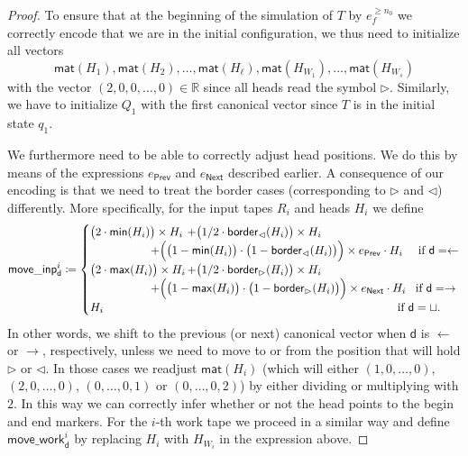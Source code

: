\begin{proof}
    To ensure that at the beginning of the simulation of $T$ by $e_f^{\geq n_0}$ we correctly encode 
    that we are in the initial configuration, we thus need to initialize all vectors 
    $$\mathsf{mat}(H_1),\mathsf{mat}(H_2),\ldots, \mathsf{mat}(H_\ell), \mathsf{mat}(H_{W_1}),\ldots, \mathsf{mat}(H_{W_s})$$
    with the vector $(2,0,0,\ldots,0)\in\mathbb{R}$ since all heads read the symbol $\rhd$. Similarly, 
    we have to initialize $Q_1$ with the first canonical vector since $T$ is in the initial state $q_1$.

    We furthermore need to be able to correctly adjust head positions. We do this by means of the expressions $e_{\mathsf{Prev}}$ and $e_{\mathsf{Next}}$	described earlier.
    A consequence of our encoding is that we need to treat the border cases (corresponding to $\rhd$ and 
    $\lhd$) differently. More specifically, for the input tapes $R_i$ and heads $H_i$ we define 
    $$
    \mathsf{move\_inp}^i_{\mathsf{d}}\coloneqq 
    \begin{cases}
    \bigl(2\cdot\mathsf{min}(H_i)\bigr)\times H_i &\!\!\!\!\!+ \bigl(1/2\cdot\mathsf{border}_{\lhd}(H_i)\bigr)\times H_i \\
    & \hspace{-4em}+\Bigl(\bigl(1-\mathsf{min}(H_i)\bigr)\cdot\bigl(1-\mathsf{border}_{\lhd}(H_i)\bigr)\Bigr)\times e_{\mathsf{Prev}}\cdot H_i \quad \text{ if $\mathsf{d}=\leftarrow$}\\
    \bigl(2\cdot \mathsf{max}(H_i)\bigr)\times H_i &\!\!\!\!\! + \bigl(1/2\cdot\mathsf{border}_{\rhd}(H_i)\bigr)\times H_i \\
    & \hspace{-4em}+ \Bigl( \bigl(1-\mathsf{max}(H_i)\bigr) \cdot \bigl(1-\mathsf{border}_{\rhd}(H_i)\bigr) \Bigr)\times e_{\mathsf{Next}}\cdot H_i  \quad\!\text{if $\mathsf{d}=\rightarrow$}\\
    H_i & \hspace{17.5em}\!\text{if $\mathsf{d}=\sqcup$}. 
    \end{cases}
    $$
    In other words, we shift to the previous (or next) canonical vector when $\mathsf{d}$ is $\leftarrow$ 
    or $\rightarrow$, respectively, unless we need to move to or from the position that will hold $\rhd$ 
    or $\lhd$. In those cases we readjust $\mathsf{mat}(H_i)$ (which will either $(1,0,\ldots,0)$, $(2,0,\ldots,0)$, 
    $(0,\ldots,0,1)$ or $(0,\ldots,0,2)$) by either dividing or multiplying with $2$. In this way we can 
    correctly infer whether or not the head points to the begin and end markers. For the $i$-th work tape we 
    proceed in a similar way and define $\mathsf{move\_work}^i_{\mathsf{d}}$ by replacing $H_{i}$ with $H_{W_i}$ in the expression above. 
 

\end{proof}
